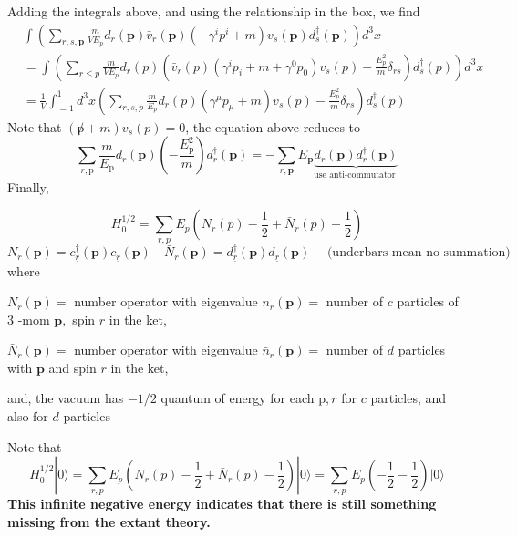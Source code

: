 Adding the integrals above, and using the relationship in the box, we find
\begin{equation}
\begin{aligned}
&\int\left(\sum_{r, s, \mathbf{p}} \frac{m}{V E_{p}} d_{r}(\mathbf{p}) \bar{v}_{r}(\mathbf{p})\left(-\gamma^{i} p^{i}+m\right) v_{s}(\mathbf{p}) d_{s}^{\dagger}(\mathbf{p})\right) d^{3} x\\
&=\int\left(\sum_{r \leq p} \frac{m}{V E_{p}} d_{r}(p)\left(\bar{v}_{r}(p)\left(\gamma^{i} p_{i}+m+\gamma^{0} p_{0}\right) v_{s}(p)-\frac{E_{p}^{2}}{m} \delta_{r s}\right) d_{s}^{\dagger}(p)\right) d^{3} x\\
&=\frac{1}{V} \int_{=1}^{1} d^{3} x\left(\sum_{r,s, p} \frac{m}{E_{p}} d_{r}(p)\left(\gamma^{\mu} p_{\mu}+m\right){v_{s}(p)-\frac{E_{p}^{2}}{m} \delta_{r s}}\right) d_{s}^{\dagger}(p)
\end{aligned}
\end{equation}
Note that $(\not p+m) v_{s}(p)=0$, the equation above reduces to
\begin{equation}
\sum_{r, \mathrm{p}} \frac{m}{E_{\mathrm{p}}} d_{r}(\mathbf{p})\left(-\frac{E_{\mathrm{p}}^{2}}{m}\right) d_{r}^{\dagger}(\mathbf{p})=-\sum_{r, \mathbf{p}} E_{\mathbf{p}} \underbrace{d_{r}(\mathbf{p}) d_{r}^{\dagger}(\mathbf{p})}_{\text {use anti-commutator }}
\end{equation}
Finally,
\begin{qt}
\begin{equation}
H_{0}^{1 / 2}=\sum_{r, p} E_{p}\left(N_{r}(p)-\frac{1}{2}+\bar{N}_{r}(p)-\frac{1}{2}\right)
\end{equation}
\begin{equation}
N_{r}(\mathbf{p})=c_{\underline{r}}^{\dagger}(\mathbf{p}) c_{\underline{r}}(\mathbf{p}) \quad \bar{N}_{r}(\mathbf{p})=d_{\underline{r}}^{\dagger}(\mathbf{p}) d_{\underline{r}}(\mathbf{p}) \quad \text { (underbars mean no summation) }
\end{equation}
where

$N_{r}(\mathbf{p})=$ number operator with eigenvalue $n_{r}(\mathbf{p})=$ number of $c$ particles of 3 -mom $\mathbf{p},$ spin $r$ in the ket,

$\bar{N}_{r}(\mathbf{p})=$ number operator with eigenvalue $\bar{n}_{r}(\mathbf{p})=$ number of $d$ particles with $\mathbf{p}$ and spin $r$ in the ket,

and, the vacuum has $-1 / 2$ quantum of energy for each $\mathrm{p}, r$ for $c$ particles, and also for $d$ particles
\end{qt}
Note that
\begin{equation}
H_{0}^{1 / 2}|0\rangle=\sum_{r, p} E_{p}\left(N_{r}(p)-\frac{1}{2}+\bar{N}_{r}(p)-\frac{1}{2}\right)|0\rangle=\sum_{r, p} E_{p}\left(-\frac{1}{2}-\frac{1}{2}\right)|0\rangle
\end{equation}
\textbf{This infinite negative energy indicates that there is still something missing from the extant theory.}

